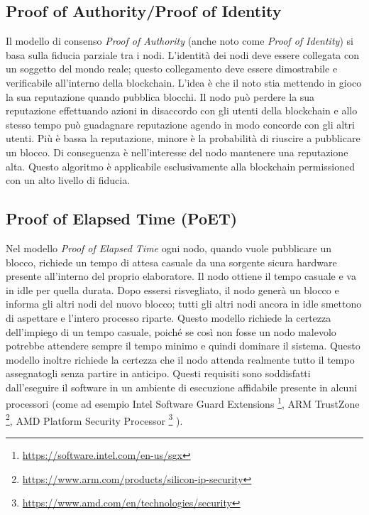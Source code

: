 \subsection{Proof of Authority/Proof of Identity}
Il modello di consenso \textit{Proof of Authority} (anche noto come \textit{Proof of Identity})
si basa sulla fiducia parziale tra i nodi.
L'identità dei nodi deve essere collegata con un soggetto del mondo reale; questo collegamento deve essere
dimostrabile e verificabile all'interno della blockchain.
L'idea è che il noto stia mettendo in gioco la sua reputazione quando pubblica blocchi.
Il nodo può perdere la sua reputazione effettuando azioni in disaccordo con gli utenti della blockchain
e allo stesso tempo può guadagnare reputazione agendo in modo concorde con gli altri utenti.
Più è bassa la reputazione, minore è la probabilità di riuscire a pubblicare un blocco.
Di conseguenza è nell'interesse del nodo mantenere una reputazione alta. Questo algoritmo
è applicabile esclusivamente alla blockchain permissioned con un alto livello di fiducia.

\subsection{Proof of Elapsed Time (PoET)}
Nel modello \textit{Proof of Elapsed Time} ogni nodo, quando vuole pubblicare un blocco,
richiede un tempo di attesa casuale da una
sorgente sicura hardware presente all'interno del proprio elaboratore.
Il nodo ottiene il tempo casuale e va in idle per quella durata. Dopo essersi risvegliato,
il nodo generà un blocco e informa gli altri nodi del nuovo blocco; tutti gli altri nodi ancora
in idle smettono di aspettare e l'intero processo riparte.
Questo modello richiede la certezza dell'impiego di un tempo casuale, poiché se così non fosse
un nodo malevolo potrebbe attendere sempre il tempo minimo e quindi dominare il sistema.
Questo modello inoltre richiede la certezza che il nodo attenda realmente tutto il tempo
assegnatogli senza partire in anticipo.
Questi requisiti sono soddisfatti dall'eseguire il software in un ambiente di esecuzione affidabile
presente in alcuni processori
(come ad esempio Intel Software Guard Extensions
\footnote{\href{https://software.intel.com/en-us/sgx}{https://software.intel.com/en-us/sgx}},
ARM TrustZone
\footnote{\href{https://www.arm.com/products/silicon-ip-security}{https://www.arm.com/products/silicon-ip-security}},
AMD Platform Security Processor
\footnote{\href{https://www.amd.com/en/technologies/security}{https://www.amd.com/en/technologies/security}}
).


